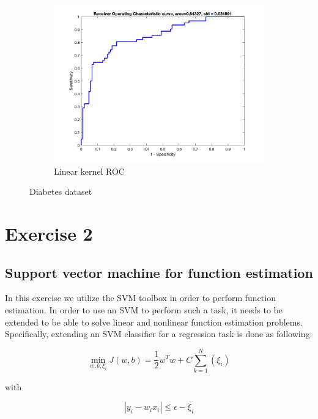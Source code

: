 \documentclass[a4paper, 11pt, one column]{article}
\begin{document}
\begin{figure}[hbt]
\begin{subfigure}{0.45\linewidth}
            \includegraphics[width=\linewidth]{images/diabetes_lin_ROC.png}
            \caption{Linear kernel ROC}
        \end{subfigure}
        \caption{Diabetes dataset}
        \label{fig:diabetes}
\end{figure}


\section{Exercise 2}
\subsection{Support vector machine for function estimation}
In this exercise we utilize the SVM toolbox in order to perform function estimation. In order to use an SVM to perform such a task, it needs to be extended to be able to solve linear and nonlinear function estimation problems. Specifically, extending an SVM classifier for a regression task is done as following:

\begin{equation}
\min\limits_{w,b,\xi_i} J(w,b) = \frac{1}{2}w^Tw + C \sum_{k=1}^{N}(\xi_i)
\end{equation}

with 

\begin{equation}
    |y_i - w_ix_i| \leq \epsilon-\xi_i 
\end{equation}
\end{document}
